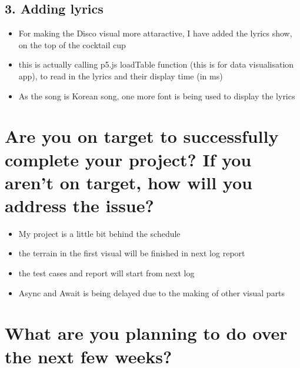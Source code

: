 \subsection*{3. Adding lyrics}

\begin{itemize}
  \item For making the Disco visual more attaractive, I have added the lyrics show, on the top of the cocktail cup
  \item this is actually calling p5.js loadTable function (this is for data visualisation app), to read in the lyrics and their display time (in ms)
  \item As the song is Korean song, one more font is being used to display the lyrics
\end{itemize}

\section*{Are you on target to successfully complete your project? If you aren’t on target, how will you address the issue?}

\begin{itemize}
  \item My project is a little bit behind the schedule
  \item the terrain in the first visual will be finished in next log report
  \item the test cases and report will start from next log
  \item Async and Await is being delayed due to the making of other visual parts
\end{itemize}

\section*{What are you planning to do over the next few weeks?}

